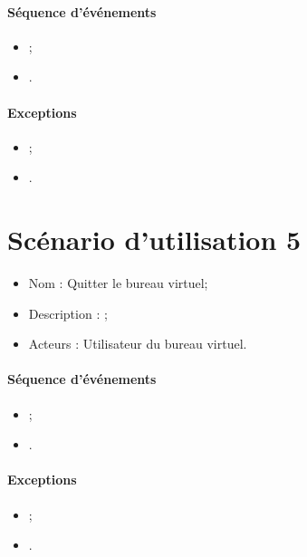 \paragraph{Séquence d'événements}
\begin{itemize}
	\item ;
	\item .
\end{itemize}

\paragraph{Exceptions}
\begin{itemize}
	\item ;
	\item .
\end{itemize}


\section{Scénario d'utilisation 5}
\begin{itemize}
	\item Nom : Quitter le bureau virtuel;
	\item Description :  ;
	\item Acteurs : Utilisateur du bureau virtuel.
\end{itemize}

\paragraph{Séquence d'événements}
\begin{itemize}
	\item ;
	\item .
\end{itemize}

\paragraph{Exceptions}
\begin{itemize}
	\item ;
	\item .
\end{itemize}

